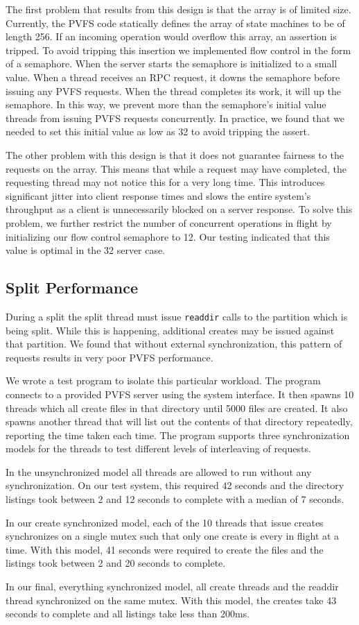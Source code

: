 \documentclass[twocolumn,letterpaper]{article}
\newcommand{\code}[1]{\texttt{#1}}
\begin{document}
The first problem that results from this design is that the array is of
limited size.  Currently, the PVFS code statically defines the array of state
machines to be of length 256.  If an incoming operation would overflow this
array, an assertion is tripped.  To avoid tripping this insertion we
implemented flow control in the form of a semaphore.  When the server starts
the semaphore is initialized to a small value.  When a thread receives an RPC
request, it downs the semaphore before issuing any PVFS requests.  When the
thread completes its work, it will up the semaphore.  In this way, we prevent
more than the semaphore's initial value threads from issuing PVFS requests
concurrently.  In practice, we found that we needed to set this initial value
as low as 32 to avoid tripping the assert.

The other problem with this design is that it does not guarantee fairness to
the requests on the array.  This means that while a request may have
completed, the requesting thread may not notice this for a very long time.
This introduces significant jitter into client response times and slows the
entire system's throughput as a client is unnecessarily blocked on a server
response.  To solve this problem, we further restrict the number of concurrent
operations in flight by initializing our flow control semaphore to 12.
Our testing indicated that this value is optimal in the 32 server case.

\subsection{Split Performance}
During a split the split thread must issue \code{readdir} calls to the
partition which is being split.  While this is happening, additional creates
may be issued against that partition.  We found that without external
synchronization, this pattern of requests results in very poor PVFS
performance.

We wrote a test program to isolate this particular workload.  The program
connects to a provided PVFS server using the system interface.  It then spawns
10 threads which all create files in that directory until 5000 files are
created.  It also spawns another thread that will list out the contents of
that directory repeatedly, reporting the time taken each time.  The program
supports three synchronization models for the threads to test different levels
of interleaving of requests.

In the unsynchronized model all threads are allowed to run without any
synchronization.  On our test system, this required 42 seconds and the
directory listings took between 2 and 12 seconds to complete with a median of
7 seconds.

In our create synchronized model, each of the 10 threads that issue creates
synchronizes on a single mutex such that only one create is every in flight at
a time.  With this model, 41 seconds were required to create the files and the
listings took between 2 and 20 seconds to complete.

In our final, everything synchronized model, all create threads and the
readdir thread synchronized on the same mutex.  With this model, the creates
take 43 seconds to complete and all listings take less than 200ms.
\end{document}
